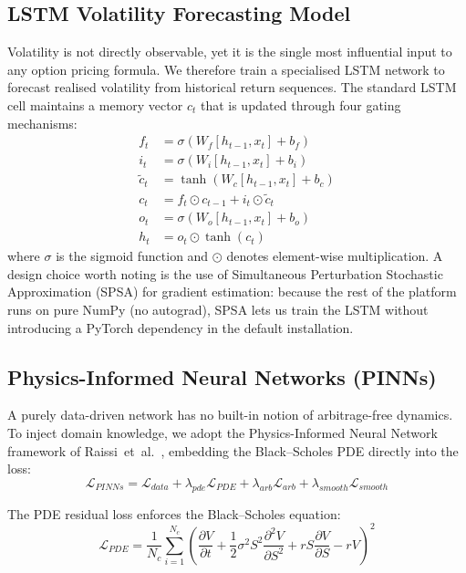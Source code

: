 \documentclass[conference]{IEEEtran}
\begin{document}
\subsection{LSTM Volatility Forecasting Model}

Volatility is not directly observable, yet it is the single most influential input to any option pricing formula. We therefore train a specialised LSTM network to forecast realised volatility from historical return sequences. The standard LSTM cell maintains a memory vector $c_t$ that is updated through four gating mechanisms:
\begin{align}
    f_t &= \sigma(W_f [h_{t-1}, x_t] + b_f) \\
    i_t &= \sigma(W_i [h_{t-1}, x_t] + b_i) \\
    \tilde{c}_t &= \tanh(W_c [h_{t-1}, x_t] + b_c) \\
    c_t &= f_t \odot c_{t-1} + i_t \odot \tilde{c}_t \\
    o_t &= \sigma(W_o [h_{t-1}, x_t] + b_o) \\
    h_t &= o_t \odot \tanh(c_t)
\end{align}
where $\sigma$ is the sigmoid function and $\odot$ denotes element-wise multiplication. A design choice worth noting is the use of Simultaneous Perturbation Stochastic Approximation (SPSA) for gradient estimation: because the rest of the platform runs on pure NumPy (no autograd), SPSA lets us train the LSTM without introducing a PyTorch dependency in the default installation.

\subsection{Physics-Informed Neural Networks (PINNs)}

A purely data-driven network has no built-in notion of arbitrage-free dynamics. To inject domain knowledge, we adopt the Physics-Informed Neural Network framework of Raissi~et~al.~\cite{b19}, embedding the Black--Scholes PDE directly into the loss:
\begin{equation}
    \mathcal{L}_{PINNs} = \mathcal{L}_{data} + \lambda_{pde}\mathcal{L}_{PDE} + \lambda_{arb}\mathcal{L}_{arb} + \lambda_{smooth}\mathcal{L}_{smooth}
\end{equation}

The PDE residual loss enforces the Black--Scholes equation:
\begin{equation}
    \mathcal{L}_{PDE} = \frac{1}{N_c} \sum_{i=1}^{N_c} \left(\frac{\partial V}{\partial t} + \frac{1}{2}\sigma^2 S^2 \frac{\partial^2 V}{\partial S^2} + rS\frac{\partial V}{\partial S} - rV\right)^2
\end{equation}
\end{document}

